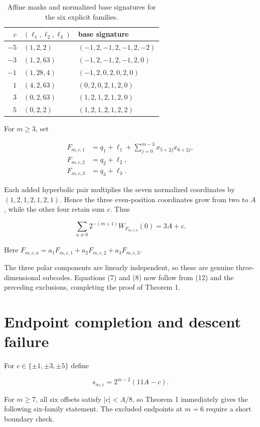 \documentclass[11pt]{article}
\begin{document}
\begin{table}[ht]
\centering
\small
\begin{tabular}{r l l}
\toprule
$c$ & $(\ell_1,\ell_2,\ell_3)$ & base signature \\
\midrule
$-5$ & $(1,2,2)$ & $(-1,2,-1,2,-1,2,-2)$ \\
$-3$ & $(1,2,63)$ & $(-1,2,-1,2,-1,2,0)$ \\
$-1$ & $(1,28,4)$ & $(-1,2,0,2,0,2,0)$ \\
$1$ & $(4,2,63)$ & $(0,2,0,2,1,2,0)$ \\
$3$ & $(0,2,63)$ & $(1,2,1,2,1,2,0)$ \\
$5$ & $(0,2,2)$ & $(1,2,1,2,1,2,2)$ \\
\bottomrule
\end{tabular}
\caption{Affine masks and normalized base signatures for the six explicit families.}
\end{table}


For $m\geq3$, set

\[
\begin{aligned}
F_{m,c,1}&=q_1+\ell_1+\sum_{j=0}^{m-3}x_{5+2j}x_{6+2j},\\
F_{m,c,2}&=q_2+\ell_2,\\
F_{m,c,3}&=q_3+\ell_3.
\end{aligned}
\tag{11}
\]

Each added hyperbolic pair multiplies the seven normalized coordinates by
$(1,2,1,2,1,2,1)$. Hence the three even-position coordinates grow from two to $A$, while the
other four retain sum $c$. Thus

\[
\sum_{a\ne0}2^{-(m+1)}W_{F_{m,c,a}}(0)=3A+c.
\tag{12}
\]

Here $F_{m,c,a}=a_1F_{m,c,1}+a_2F_{m,c,2}+a_3F_{m,c,3}$.

The three polar components are linearly independent, so these are genuine three-dimensional
subcodes. Equations (7) and (8) now follow from (12) and the preceding exclusions, completing the
proof of Theorem 1.

\section{Endpoint completion and descent failure}


For $c\in\{\pm1,\pm3,\pm5\}$ define

\[
s_{m,c}=2^{m-2}(11A-c).
\tag{13}
\]

For $m\geq7$, all six offsets satisfy $|c|<A/8$, so Theorem 1 immediately gives the following
six-family statement. The excluded endpoints at $m=6$ require a short boundary check.
\end{document}
